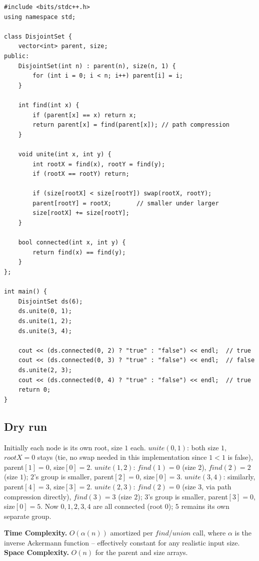 \begin{lstlisting}
#include <bits/stdc++.h>
using namespace std;

class DisjointSet {
    vector<int> parent, size;
public:
    DisjointSet(int n) : parent(n), size(n, 1) {
        for (int i = 0; i < n; i++) parent[i] = i;
    }

    int find(int x) {
        if (parent[x] == x) return x;
        return parent[x] = find(parent[x]); // path compression
    }

    void unite(int x, int y) {
        int rootX = find(x), rootY = find(y);
        if (rootX == rootY) return;

        if (size[rootX] < size[rootY]) swap(rootX, rootY);
        parent[rootY] = rootX;       // smaller under larger
        size[rootX] += size[rootY];
    }

    bool connected(int x, int y) {
        return find(x) == find(y);
    }
};

int main() {
    DisjointSet ds(6);
    ds.unite(0, 1);
    ds.unite(1, 2);
    ds.unite(3, 4);

    cout << (ds.connected(0, 2) ? "true" : "false") << endl;  // true
    cout << (ds.connected(0, 3) ? "true" : "false") << endl;  // false
    ds.unite(2, 3);
    cout << (ds.connected(0, 4) ? "true" : "false") << endl;  // true
    return 0;
}
\end{lstlisting}

\subsection*{Dry run}


Initially each node is its own root, size $1$ each.
$\textit{unite}(0,1)$: both size $1$, $\textit{rootX}=0$ stays (tie,
no swap needed in this implementation since $1<1$ is false), parent$[1]=0$,
size$[0]=2$. $\textit{unite}(1,2)$: $\textit{find}(1)=0$ (size $2$),
$\textit{find}(2)=2$ (size $1$); $2$'s group is smaller, parent$[2]=0$,
size$[0]=3$. $\textit{unite}(3,4)$: similarly, parent$[4]=3$,
size$[3]=2$. $\textit{unite}(2,3)$: $\textit{find}(2)=0$ (size $3$,
via path compression directly), $\textit{find}(3)=3$ (size $2$); $3$'s
group is smaller, parent$[3]=0$, size$[0]=5$. Now $0,1,2,3,4$ are all
connected (root $0$); $5$ remains its own separate group.

\begin{complexitybox}
\textbf{Time Complexity.} $O(\alpha(n))$ amortized per
$\textit{find}$/$\textit{union}$ call, where $\alpha$ is the inverse
Ackermann function -- effectively constant for any realistic input
size.
\textbf{Space Complexity.} $O(n)$ for the parent and size arrays.
\end{complexitybox}

